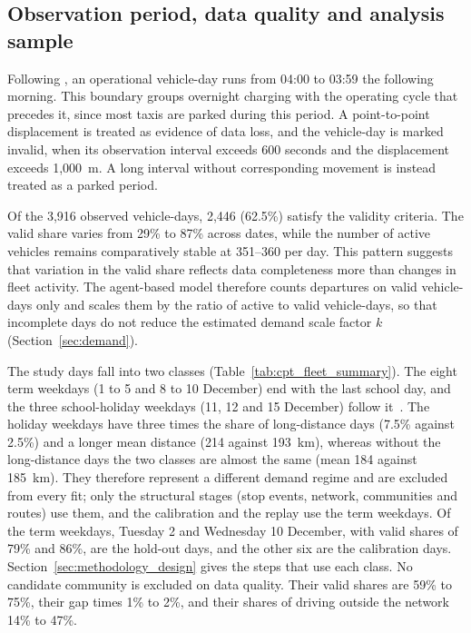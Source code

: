 \documentclass{elsarticle}
\begin{document}
\subsection{Observation period, data quality and analysis sample}
\label{sec:study_days}
Following \citet{pretorius2024_grid_mobility_interdependence}, an operational vehicle-day runs from 04:00 to 03:59 the following morning. This boundary groups overnight charging with the operating cycle that precedes it, since most taxis are parked during this period. A point-to-point displacement is treated as evidence of data loss, and the vehicle-day is marked invalid, when its observation interval exceeds 600 seconds and the displacement exceeds 1,000~m. A long interval without corresponding movement is instead treated as a parked period.

Of the 3,916 observed vehicle-days, 2,446 (62.5\%) satisfy the validity criteria. The valid share varies from 29\% to 87\% across dates, while the number of active vehicles remains comparatively stable at 351--360 per day. This pattern suggests that variation in the valid share reflects data completeness more than changes in fleet activity. The agent-based model therefore counts departures on valid vehicle-days only and scales them by the ratio of active to valid vehicle-days, so that incomplete days do not reduce the estimated demand scale factor $k$ (Section~\ref{sec:demand}).

The study days fall into two classes (Table~\ref{tab:cpt_fleet_summary}). The eight term weekdays (1 to 5 and 8 to 10 December) end with the last school day, and the three school-holiday weekdays (11, 12 and 15 December) follow it~\cite{dbe2023_school_calendar}. The holiday weekdays have three times the share of long-distance days (7.5\% against 2.5\%) and a longer mean distance (214 against 193~km), whereas without the long-distance days the two classes are almost the same (mean 184 against 185~km). They therefore represent a different demand regime and are excluded from every fit; only the structural stages (stop events, network, communities and routes) use them, and the calibration and the replay use the term weekdays. Of the term weekdays, Tuesday 2 and Wednesday 10 December, with valid shares of 79\% and 86\%, are the hold-out days, and the other six are the calibration days. Section~\ref{sec:methodology_design} gives the steps that use each class. No candidate community is excluded on data quality. Their valid shares are 59\% to 75\%, their gap times 1\% to 2\%, and their shares of driving outside the network 14\% to 47\%.
\end{document}
